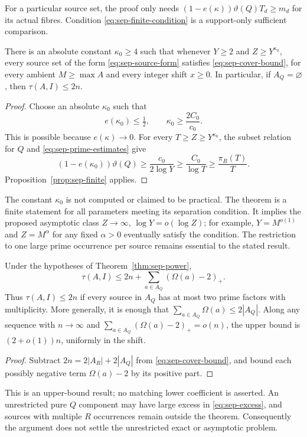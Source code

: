 For a particular source set, the proof only needs
$(1-e(\kappa))\vartheta(Q)T_d\ge m_d$ for its actual fibres. Condition
\eqref{eq:sep-finite-condition} is a support-only sufficient comparison.

\begin{theorem}
\label{thm:sep-power}
There is an absolute constant $\kappa_0\ge4$ such that whenever
$Y\ge2$ and $Z\ge Y^{\kappa_0}$, every source set of the form
\eqref{eq:sep-source-form} satisfies \eqref{eq:sep-cover-bound}, for every
ambient $M\ge\max A$ and every integer shift $x\ge0$. In particular, if
$A_Q=\varnothing$, then $\tau(A,I)\le2n$.
\end{theorem}

\begin{proof}
Choose an absolute $\kappa_0$ such that
\[
 e(\kappa_0)\le\tfrac12,
 \qquad \kappa_0\ge\frac{2C_0}{c_0}.
\]
This is possible because $e(\kappa)\to0$. For every $T\ge Z\ge
Y^{\kappa_0}$, the subset relation for $Q$ and
\eqref{eq:sep-prime-estimates} give
\[
 (1-e(\kappa_0))\vartheta(Q)
 \ge\frac{c_0}{2\log Y}
 \ge\frac{C_0}{\log T}
 \ge\frac{\pi_R(T)}T.
\]
Proposition~\ref{prop:sep-finite} applies.
\end{proof}

The constant $\kappa_0$ is not computed or claimed to be practical. The
theorem is a finite statement for all parameters meeting its separation
condition. It implies the proposed asymptotic class $Z\to\infty$,
$\log Y=o(\log Z)$; for example, $Y=M^{o(1)}$ and $Z=M^\alpha$ for any
fixed $\alpha>0$ eventually satisfy the condition. The restriction to one
large prime occurrence per source remains essential to the stated result.

\begin{corollary}
\label{cor:sep-pure}
Under the hypotheses of Theorem~\ref{thm:sep-power},
\begin{equation}
 \tau(A,I)\le2n+\sum_{a\in A_Q}(\Omega(a)-2)_+.
 \label{eq:sep-excess}
\end{equation}
Thus $\tau(A,I)\le2n$ if every source in $A_Q$ has at most two prime
factors with multiplicity. More generally, it is enough that
$\sum_{a\in A_Q}\Omega(a)\le2|A_Q|$. Along any sequence with
$n\to\infty$ and $\sum_{a\in A_Q}(\Omega(a)-2)_+=o(n)$, the upper
bound is $(2+o(1))n$, uniformly in the shift.
\end{corollary}

\begin{proof}
Subtract $2n=2|A_R|+2|A_Q|$ from \eqref{eq:sep-cover-bound}, and bound
each possibly negative term $\Omega(a)-2$ by its positive part.
\end{proof}

This is an upper-bound result; no matching lower coefficient is asserted.
An unrestricted pure $Q$ component may have large excess in
\eqref{eq:sep-excess}, and sources with multiple $R$ occurrences remain
outside the theorem. Consequently the argument does not settle the
unrestricted exact or asymptotic problem.
